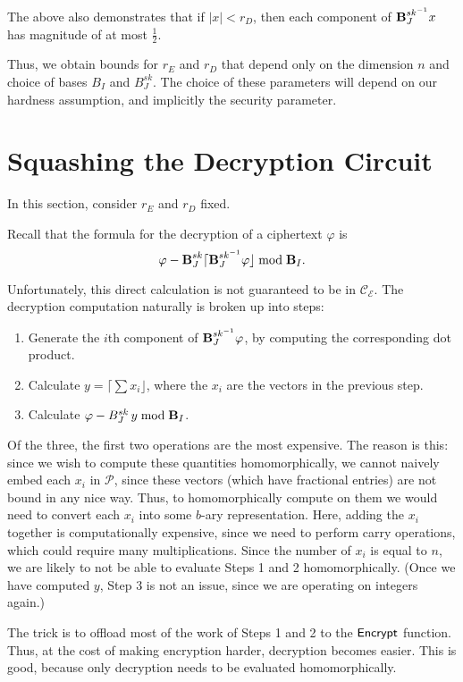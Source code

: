 The above also demonstrates that if $|x| < r_D$, then each component of $\textbf{B}_J^{sk ^{-1}} x$ has magnitude of at most $\frac{1}{2}$.

Thus, we obtain bounds for $r_E$ and $r_D$ that depend only on the dimension $n$ and choice of bases $B_I$ and $B_J^{sk}$. The choice of these parameters will depend on our hardness assumption, and implicitly the security parameter.

\section{Squashing the Decryption Circuit}
\label{sec:squash}
In this section, consider $r_E$ and $r_D$ fixed.

Recall that the formula for the decryption of a ciphertext $\varphi$ is
\[\varphi - \textbf{B}_J^{sk} \lceil \textbf{B}_J^{sk ^{-1}} \varphi \rfloor \bmod \textbf{B}_I.\]

Unfortunately, this direct calculation is not guaranteed to be in $\mathcal{C}_\mathcal{E}$. The decryption computation naturally is broken up into steps:
\begin{enumerate}
\item Generate the $i$th component of $\textbf{B}_J^{sk ^{-1}} \varphi$, by computing the corresponding dot product.
\item Calculate $y = \lceil \sum x_i \rfloor$, where the $x_i$ are the vectors in the previous step.
\item Calculate $\varphi - B_J^{sk} \, y \bmod \textbf{B}_I$.
\end{enumerate}

Of the three, the first two operations are the most expensive. The reason is this: since we wish to compute these quantities homomorphically, we cannot naively embed each $x_i$ in $\mathcal{P}$, since these vectors (which have fractional entries) are not bound in any nice way. Thus, to homomorphically compute on them we would need to convert each $x_i$ into some $b$-ary representation. Here, adding the $x_i$ together is computationally expensive, since we need to perform carry operations, which could require many multiplications. Since the number of $x_i$ is equal to $n$, we are likely to not be able to evaluate Steps 1 and 2 homomorphically. (Once we have computed $y$, Step 3 is not an issue, since we are operating on integers again.)


The trick is to offload most of the work of Steps 1 and 2 to the ${\sf Encrypt}$ function. Thus, at the cost of making encryption harder, decryption becomes easier. This is good, because only decryption needs to be evaluated homomorphically.

